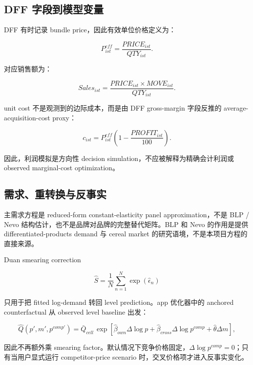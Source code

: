 \documentclass[UTF8,11pt,a4paper,fontset=none]{ctexart}
\begin{document}
\subsection{DFF 字段到模型变量}

DFF 有时记录 bundle price，因此有效单位价格定义为：

\begin{equation}
P^{eff}_{ist}=\frac{PRICE_{ist}}{QTY_{ist}}.
\end{equation}

对应销售额为：

\begin{equation}
Sales_{ist}=\frac{PRICE_{ist}\times MOVE_{ist}}{QTY_{ist}}.
\end{equation}

unit cost 不是观测到的边际成本，而是由 DFF gross-margin 字段反推的 average-acquisition-cost proxy：

\begin{equation}
c_{ist}=P^{eff}_{ist}\left(1-\frac{PROFIT_{ist}}{100}\right).
\end{equation}

因此，利润模拟是方向性 decision simulation，不应被解释为精确会计利润或 observed marginal-cost optimization。

\subsection{需求、重转换与反事实}

主需求方程是 reduced-form constant-elasticity panel approximation，不是 BLP / Nevo 结构估计，也不是品牌对品牌的完整替代矩阵。BLP 和 Nevo 的作用是提供 differentiated-products demand 与 cereal market 的研究语境，不是本项目方程的直接来源。

Duan smearing correction

\begin{equation}
\widehat{S}=\frac{1}{N}\sum_{n=1}^{N}\exp(\widehat{\epsilon}_n)
\end{equation}

只用于把 fitted log-demand 转回 level prediction。app 优化器中的 anchored counterfactual 从 observed level baseline 出发：

\begin{equation}
\widehat{Q}(p',m',p^{comp\prime})=
\bar{Q}_{cell}\,
\exp\left[
\widehat{\beta}_{own}\Delta\log p
+\widehat{\beta}_{cross}\Delta\log p^{comp}
+\widehat{\theta}\Delta m
\right],
\end{equation}

因此不再额外乘 smearing factor。默认情况下竞争价格固定，$\Delta\log p^{comp}=0$；只有当用户显式运行 competitor-price scenario 时，交叉价格项才进入反事实变化。
\end{document}
